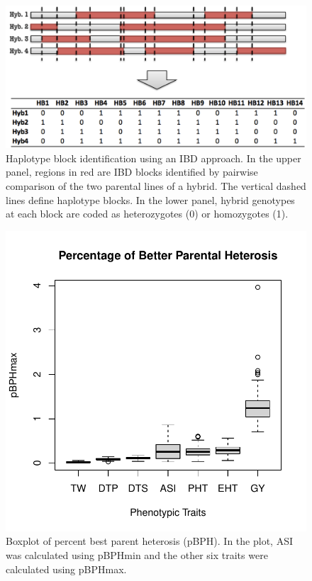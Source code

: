 \documentclass[9pt,twocolumn,twoside]{gsajnl}
\begin{document}
\begin{figure}[htbp]
\centering
\includegraphics[width=\linewidth]{SFig_define_IBD.pdf}
\caption{Haplotype block identification using an IBD approach. In the upper panel, regions in red are IBD blocks identified by pairwise comparison of the two parental lines of a hybrid. The vertical dashed lines define haplotype blocks. In the lower panel, hybrid genotypes at each block are coded as heterozygotes (0) or homozygotes (1).}
\label{fig:defineibd}
\end{figure}



\begin{figure}[htbp]
\centering
\includegraphics[width=\linewidth]{SFig_pBPH.pdf}
\caption{Boxplot of  percent best parent heterosis (pBPH). In the plot, ASI was calculated using pBPHmin and the other six traits were calculated using pBPHmax.}
\label{fig:pBPH}
\end{figure}
\end{document}
